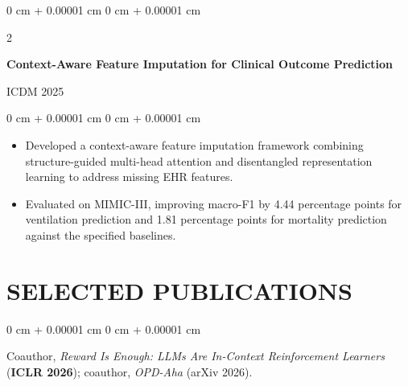 \documentclass[10pt, letterpaper]{article}
\newenvironment{highlights}{
    \begin{itemize}[
        topsep=0.03 cm,
        parsep=0.03 cm,
        partopsep=0pt,
        itemsep=0pt,
        leftmargin=0 cm + 10pt
    ]
}{
    \end{itemize}
} %
\newenvironment{onecolentry}{
    \begin{adjustwidth}{
        0 cm + 0.00001 cm
    }{
        0 cm + 0.00001 cm
    }
}{
    \end{adjustwidth}
} %
\newenvironment{twocolentry}[2][]{
    \onecolentry
    \def\secondColumn{#2}
    \setcolumnwidth{\fill, 4.5 cm}
    \begin{paracol}{2}
}{
    \switchcolumn \raggedleft \secondColumn
    \end{paracol}
    \endonecolentry
} %
\begin{document}
\begin{twocolentry}{ICDM 2025}
\textbf{Context-Aware Feature Imputation for Clinical Outcome Prediction}
\end{twocolentry}
\begin{onecolentry}
\begin{highlights}
\item Developed a context-aware feature imputation framework combining structure-guided multi-head attention and disentangled representation learning to address missing EHR features.
\item Evaluated on MIMIC-III, improving macro-F1 by 4.44 percentage points for ventilation prediction and 1.81 percentage points for mortality prediction against the specified baselines.
\end{highlights}
\end{onecolentry}
\vspace{0.06 cm}
\section{SELECTED PUBLICATIONS}
\begin{onecolentry}
Coauthor, \textit{Reward Is Enough: LLMs Are In-Context Reinforcement Learners} (\textbf{ICLR 2026}); coauthor, \textit{OPD-Aha} (arXiv 2026).
\end{onecolentry}
\end{document}
